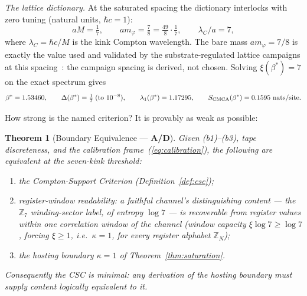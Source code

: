 \documentclass[11pt]{article}
\newtheorem{theorem}{Theorem}[section]
\theoremstyle{remark}
\newcommand{\CatAD}{\textbf{A/D}}
\begin{document}
\medskip
\noindent\emph{The lattice dictionary.} At the saturated spacing the
dictionary interlocks with zero tuning (natural units, $\hbar c = 1$):
\begin{equation}\label{eq:dictionary}
  aM = \tfrac{1}{7}, \qquad
  am_\varphi = \tfrac{7}{8} = \tfrac{49}{8} \cdot \tfrac{1}{7}, \qquad
  \lambda_C/a = 7,
\end{equation}
where $\lambda_C = \hbar c/M$ is the kink Compton wavelength. The bare mass
$am_\varphi = 7/8$ is exactly the value used and validated by the
substrate-regulated lattice campaigns at this
spacing~\cite{SpivackPhiMDLField}: the campaign spacing is derived, not
chosen. Solving $\xi(\beta^*) = 7$ on the exact spectrum gives
\begin{equation}
  \beta^* = 1.53460, \qquad \Delta(\beta^*) = \tfrac{1}{7}
  \;(\text{to } 10^{-8}), \qquad \lambda_1(\beta^*) = 1.17295, \qquad
  S_{\rm CMCA}(\beta^*) = 0.1595 \text{ nats/site}.
\end{equation}

How strong is the named criterion? It is provably as weak as possible:

\begin{theorem}[Boundary Equivalence --- \CatAD{}]
\label{thm:boundary-equiv}
Given (b1)--(b3), tape discreteness, and the calibration
frame~(\ref{eq:calibration}), the following are equivalent at the seven-kink
threshold:
\begin{enumerate}[leftmargin=2em,itemsep=1pt,label=(\roman*)]
  \item the Compton-Support Criterion (Definition~\ref{def:csc});
  \item \emph{register-window readability}: a faithful channel's
    distinguishing content --- the $\mathbb{Z}_7$ winding-sector label, of
    entropy $\log 7$ --- is recoverable from register values within one
    correlation window of the channel (window capacity
    $\xi \log 7 \ge \log 7$, forcing $\xi \ge 1$, i.e.\ $\kappa = 1$, for
    every register alphabet $\mathbb{Z}_N$);
  \item the hosting boundary $\kappa = 1$ of Theorem~\ref{thm:saturation}.
\end{enumerate}
Consequently the CSC is \emph{minimal}: any derivation of the hosting boundary
must supply content logically equivalent to it.
\end{theorem}
\end{document}
